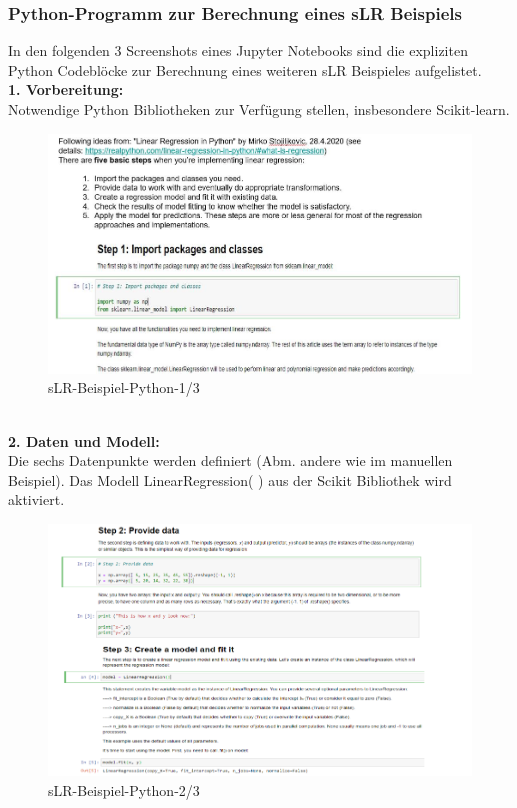\documentclass[12pt]{article}
\begin{document}
\subsubsection{Python-Programm zur Berechnung eines sLR Beispiels}
In den folgenden 3 Screenshots eines Jupyter Notebooks sind die expliziten Python Codeblöcke zur Berechnung eines weiteren sLR Beispieles aufgelistet.\\[0.2cm]
\hspace*{0.5cm} \textbf{1. Vorbereitung:}\\
Notwendige Python Bibliotheken zur Verfügung stellen, insbesondere Scikit-learn.
% 
\begin{figure}[htp]
  \centering
  \hspace*{-1.0cm} 
  \includegraphics[width=1.25\textwidth]{sLR_Beispiel_Scikit-Learn-01}
  \caption{sLR-Beispiel-Python-1/3}
  \label{fig:sLR-SciKit-Learn01}  
\end{figure}
\\[1.2cm]
\hspace*{0.5cm} \textbf{2. Daten und Modell:}\\
Die sechs Datenpunkte werden definiert (Abm. andere wie im manuellen Beispiel). Das Modell LinearRegression( ) aus der Scikit Bibliothek wird aktiviert. 
\begin{figure}[htp]
  \centering
  \hspace*{-1.0cm} 
  \includegraphics[width=1.4\textwidth]{sLR_Beispiel_Scikit-Learn-02}
  \caption{sLR-Beispiel-Python-2/3}
  \label{fig:sLR-SciKit-Learn02}
\end{figure}
\end{document}

